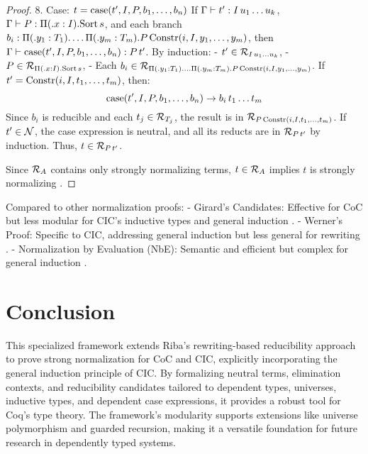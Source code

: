 \documentclass{article}
\begin{document}
\begin{proof}[Proof]
8. Case: \(t = \text{case}(t', I, P, b_1, \dots, b_n)\)
   If \(\Gamma \vdash t' : I \, u_1 \dots u_k\),
      \(\Gamma \vdash P : \Pi ( . x : I). \text{Sort} \, s\),
   and each branch \(b_i : \Pi ( . y_1 : T_1). \dots \Pi ( . y_m : T_m).
   P \, \text{Constr}(i, I, y_1, \dots, y_m)\),
   then \(\Gamma \vdash \text{case}(t', I, P, b_1, \dots, b_n) : P \, t'\).
   By induction:
   - \(t' \in \mathcal{R}_{I \, u_1 \dots u_k}\),
   - \(P \in \mathcal{R}_{\Pi ( . x : I). \text{Sort} \, s}\),
   - Each \(b_i \in \mathcal{R}_{\Pi ( . y_1 : T_1). \dots \Pi ( . y_m : T_m).
     P \, \text{Constr}(i, I, y_1, \dots, y_m)}\).
   If \(t' = \text{Constr}(i, I, t_1, \dots, t_m)\), then:
   \[
   \text{case}(t', I, P, b_1, \dots, b_n) \to b_i \, t_1 \dots t_m
   \]
   Since \(b_i\) is reducible and each \(t_j \in \mathcal{R}_{T_j}\),
   the result is in \(\mathcal{R}_{P \, \text{Constr}(i, I, t_1, \dots, t_m)}\).
   If \(t' \in \mathcal{N}\), the case expression is neutral,
   and all its reducts are in \(\mathcal{R}_{P \, t'}\) by induction.
   Thus, \(t \in \mathcal{R}_{P \, t'}\).

Since \(\mathcal{R}_A\) contains only strongly normalizing terms,
\(t \in \mathcal{R}_A\) implies \(t\) is strongly normalizing \cite{riba2008, werner1994}.
\end{proof}

Compared to other normalization proofs:
- Girard’s Candidates: Effective for CoC but less modular for CIC’s
  inductive types and general induction \cite{girard1972}.
- Werner’s Proof: Specific to CIC, addressing general induction
  but less general for rewriting \cite{werner1994}.
- Normalization by Evaluation (NbE): Semantic and efficient but
  complex for general induction \cite{abel2012}.

\section{Conclusion}
This specialized framework extends Riba’s rewriting-based reducibility approach
to prove strong normalization for CoC and CIC, explicitly incorporating the general
induction principle of CIC. By formalizing neutral terms, elimination contexts,
and reducibility candidates tailored to dependent types, universes, inductive types,
and dependent case expressions, it provides a robust tool for Coq’s type theory.
The framework’s modularity supports extensions like universe polymorphism and guarded recursion,
making it a versatile foundation for future research in dependently typed systems.
\end{document}
